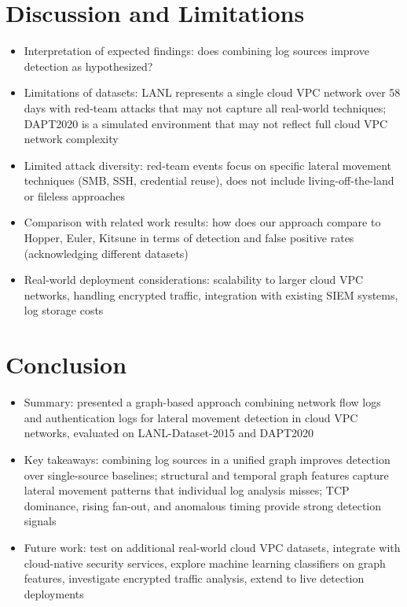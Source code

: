\documentclass[letterpaper,twocolumn,10pt]{article}
\begin{document}
\section{Discussion and Limitations}
\begin{itemize}
\item Interpretation of expected findings: does combining log sources improve detection as hypothesized?
\item Limitations of datasets: LANL represents a single cloud VPC network over 58 days with red-team attacks that may not capture all real-world techniques; DAPT2020 is a simulated environment that may not reflect full cloud VPC network complexity
\item Limited attack diversity: red-team events focus on specific lateral movement techniques (SMB, SSH, credential reuse), does not include living-off-the-land or fileless approaches
\item Comparison with related work results: how does our approach compare to Hopper, Euler, Kitsune in terms of detection and false positive rates (acknowledging different datasets)
\item Real-world deployment considerations: scalability to larger cloud VPC networks, handling encrypted traffic, integration with existing SIEM systems, log storage costs
\end{itemize}

\section{Conclusion}
\begin{itemize}
\item Summary: presented a graph-based approach combining network flow logs and authentication logs for lateral movement detection in cloud VPC networks, evaluated on LANL-Dataset-2015 and DAPT2020
\item Key takeaways: combining log sources in a unified graph improves detection over single-source baselines; structural and temporal graph features capture lateral movement patterns that individual log analysis misses; TCP dominance, rising fan-out, and anomalous timing provide strong detection signals
\item Future work: test on additional real-world cloud VPC datasets, integrate with cloud-native security services, explore machine learning classifiers on graph features, investigate encrypted traffic analysis, extend to live detection deployments
\end{itemize}

{\footnotesize 
}
\end{document}
